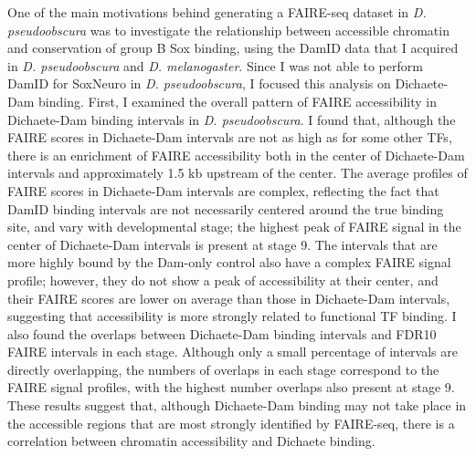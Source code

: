 One of the main motivations behind generating a FAIRE-seq dataset in \emph{D. pseudoobscura} was to investigate the relationship between accessible chromatin and conservation of group B Sox binding, using the DamID data that I acquired in \emph{D. pseudoobscura} and \emph{D. melanogaster}. Since I was not able to perform DamID for SoxNeuro in \emph{D. pseudoobscura}, I focused this analysis on Dichaete-Dam binding. First, I examined the overall pattern of FAIRE accessibility in Dichaete-Dam binding intervals in \emph{D. pseudoobscura}. I found that, although the FAIRE scores in Dichaete-Dam intervals are not as high as for some other TFs, there is an enrichment of FAIRE accessibility both in the center of Dichaete-Dam intervals and approximately 1.5 kb upstream of the center. The average profiles of FAIRE scores in Dichaete-Dam intervals are complex, reflecting the fact that DamID binding intervals are not necessarily centered around the true binding site, and vary with developmental stage; the highest peak of FAIRE signal in the center of Dichaete-Dam intervals is present at stage 9. The intervals that are more highly bound by the Dam-only control also have a complex FAIRE signal profile; however, they do not show a peak of accessibility at their center, and their FAIRE scores are lower on average than those in Dichaete-Dam intervals, suggesting that accessibility is more strongly related to functional TF binding. I also found the overlaps between Dichaete-Dam binding intervals and FDR10 FAIRE intervals in each stage. Although only a small percentage of intervals are directly overlapping, the numbers of overlaps in each stage correspond to the FAIRE signal profiles, with the highest number overlaps also present at stage 9. These results suggest that, although Dichaete-Dam binding may not take place in the accessible regions that are most strongly identified by FAIRE-seq, there is a correlation between chromatin accessibility and Dichaete binding.\\


